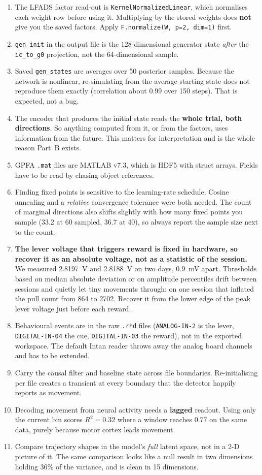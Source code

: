 \documentclass[11pt]{article}
\begin{document}
\begin{enumerate}
\item The LFADS factor read-out is \texttt{KernelNormalizedLinear}, which
normalises each weight row before using it. Multiplying by the stored weights
does \textbf{not} give you the saved factors. Apply
\texttt{F.normalize(W, p=2, dim=1)} first.
\item \texttt{gen\_init} in the output file is the 128-dimensional generator
state \emph{after} the \texttt{ic\_to\_g0} projection, not the 64-dimensional
sample.
\item Saved \texttt{gen\_states} are averages over 50 posterior samples. Because
the network is nonlinear, re-simulating from the average starting state does not
reproduce them exactly (correlation about 0.99 over 150 steps). That is expected,
not a bug.
\item The encoder that produces the initial state reads the \textbf{whole trial,
both directions}. So anything computed from it, or from the factors, uses
information from the future. This matters for interpretation and is the whole
reason Part~B exists.
\item GPFA \texttt{.mat} files are MATLAB v7.3, which is HDF5 with struct arrays.
Fields have to be read by chasing object references.
\item Finding fixed points is sensitive to the learning-rate schedule. Cosine
annealing and a \emph{relative} convergence tolerance were both needed. The count
of marginal directions also shifts slightly with how many fixed points you sample
(33.2 at 60 sampled, 36.7 at 40), so always report the sample size next to the
count.
\item \textbf{The lever voltage that triggers reward is fixed in hardware, so
recover it as an absolute voltage, not as a statistic of the session.} We
measured 2.8197~V and 2.8188~V on two days, 0.9~mV apart. Thresholds based on
median absolute deviation or on amplitude percentiles drift between sessions and
quietly let tiny movements through: on one session that inflated the pull count
from 864 to 2702. Recover it from the lower edge of the peak lever voltage just
before each reward.
\item Behavioural events are in the raw \texttt{.rhd} files
(\texttt{ANALOG-IN-2} is the lever, \texttt{DIGITAL-IN-04} the cue,
\texttt{DIGITAL-IN-03} the reward), not in the exported workspace. The default
Intan reader throws away the analog board channels and has to be extended.
\item Carry the causal filter and baseline state across file boundaries.
Re-initialising per file creates a transient at every boundary that the detector
happily reports as movement.
\item Decoding movement from neural activity needs a \textbf{lagged} readout.
Using only the current bin scores $R^2 = 0.32$ where a window reaches $0.77$ on
the same data, purely because motor cortex leads movement.
\item Compare trajectory shapes in the model's \emph{full} latent space, not in a
2-D picture of it. The same comparison looks like a null result in two dimensions
holding 36\% of the variance, and is clean in 15 dimensions.
\end{enumerate}
\end{document}
